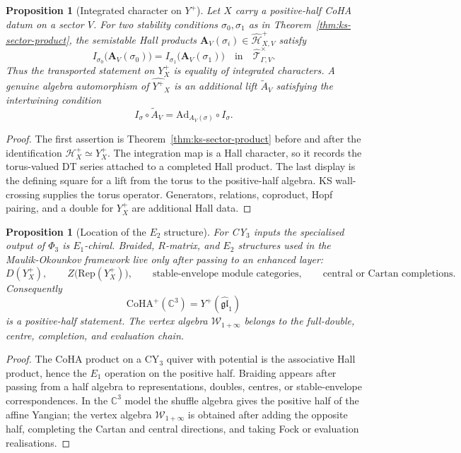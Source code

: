 \documentclass[11pt]{article}
\newtheorem{proposition}[theorem]{Proposition}
\theoremstyle{definition}
\providecommand{\C}{\mathbb{C}}
\providecommand{\cH}{\mathcal{H}}
\providecommand{\cT}{\mathcal{T}}
\providecommand{\Yplus}{Y^{+}}
\providecommand{\CoHA}{\mathrm{CoHA}}
\providecommand{\Ad}{\mathrm{Ad}}
\providecommand{\Rep}{\mathrm{Rep}}
\begin{document}
\begin{proposition}[Integrated character on \texorpdfstring{$\Yplus$}{Y+}]
\label{prop:yplus-integrated-character}
Let $X$ carry a positive-half CoHA datum on a sector $V$. For two
stability conditions $\sigma_0,\sigma_1$ as in
Theorem~\ref{thm:ks-sector-product}, the semistable Hall products
$\mathbf A_V(\sigma_i)\in\widehat{\cH}_{X,V}^+$ satisfy
\[
 I_{\sigma_0}\bigl(\mathbf A_V(\sigma_0)\bigr)
 =
 I_{\sigma_1}\bigl(\mathbf A_V(\sigma_1)\bigr)
 \quad\text{in}\quad
 \widehat{\cT}_{\Gamma,V}^{\times}.
\]
Thus the transported statement on $\Yplus_X$ is equality of integrated
characters. A genuine algebra automorphism of $\widehat{\Yplus}_X$ is an
additional lift $\widetilde A_V$ satisfying the intertwining condition
\[
 I_\sigma\circ\widetilde A_V
 =
 \Ad_{A_V(\sigma)}\circ I_\sigma .
\]
\end{proposition}

\begin{proof}
The first assertion is Theorem~\ref{thm:ks-sector-product} before and
after the identification $\cH_X^+\simeq\Yplus_X$. The integration map
is a Hall character, so it records the torus-valued DT series attached
to a completed Hall product. The last display is the defining square for
a lift from the torus to the positive-half algebra. KS wall-crossing
supplies the torus operator. Generators, relations, coproduct, Hopf
pairing, and a double for $\Yplus_X$ are additional Hall data.
\end{proof}

\begin{proposition}[Location of the \texorpdfstring{$E_2$}{E2} structure]
\label{prop:e2-location}
For CY$_3$ inputs the specialised output of $\Phi_3$ is $E_1$-chiral.
Braided, $R$-matrix, and $E_2$ structures used in the
Maulik-Okounkov framework live only after passing to an enhanced layer:
\[
 D(\Yplus_X),\qquad
 Z\bigl(\Rep(\Yplus_X)\bigr),\qquad
 \text{stable-envelope module categories},\qquad
 \text{central or Cartan completions}.
\]
Consequently
\[
 \CoHA^+(\C^3)=\Yplus(\widehat{\mathfrak{gl}}_1)
\]
is a positive-half statement. The vertex algebra
$\mathcal W_{1+\infty}$ belongs to the full-double, centre, completion,
and evaluation chain.
\end{proposition}

\begin{proof}
The CoHA product on a CY$_3$ quiver with potential is the associative
Hall product, hence the $E_1$ operation on the positive half. Braiding
appears after passing from a half algebra to representations, doubles,
centres, or stable-envelope correspondences. In the $\C^3$ model the
shuffle algebra gives the positive half of the affine Yangian; the
vertex algebra $\mathcal W_{1+\infty}$ is obtained after adding the
opposite half, completing the Cartan and central directions, and taking
Fock or evaluation realisations.
\end{proof}
\end{document}
